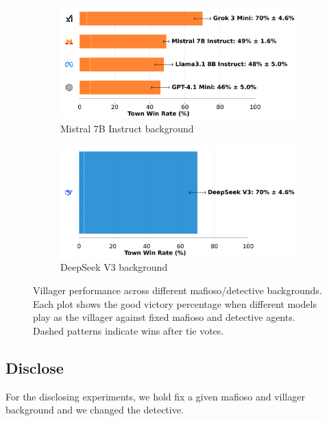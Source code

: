 \documentclass{article}
\begin{document}
\begin{figure}[htbp]
    \begin{subfigure}[b]{0.48\textwidth}
        \centering
        \includegraphics[width=\textwidth]{../results/villager_mistral_7b_instruct_v4_1_benchmark.png}
        \caption{Mistral 7B Instruct background}
        \label{fig:villager_mistral}
    \end{subfigure}
    \hfill
    \begin{subfigure}[b]{0.48\textwidth}
        \centering
        \includegraphics[width=\textwidth]{../results/villager_deepseek_v3_v4_1_benchmark.png}
        \caption{DeepSeek V3 background}
        \label{fig:villager_deepseek}
    \end{subfigure}
    \caption{Villager performance across different mafioso/detective backgrounds. Each plot shows the good victory percentage when different models play as the villager against fixed mafioso and detective agents. Dashed patterns indicate wins after tie votes.}
    \label{fig:detect_results}
\end{figure}

\subsection{Disclose}

For the disclosing experiments, we hold fix a given mafioso and villager background and we changed the detective.
\end{document}
